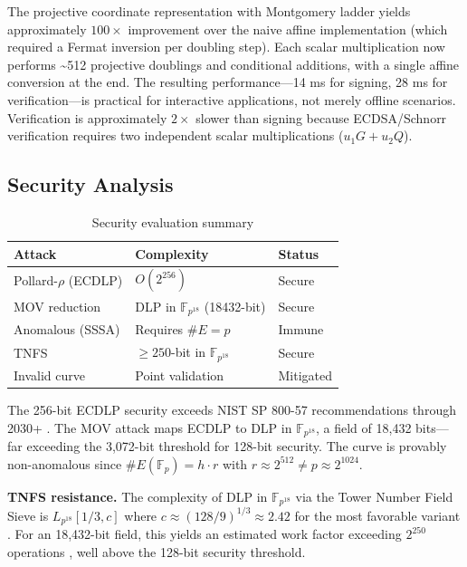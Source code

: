 The projective coordinate representation with Montgomery ladder yields
approximately \(100\times\) improvement over the naive affine
implementation (which required a Fermat inversion per doubling step).
Each scalar multiplication now performs \textasciitilde512 projective
doublings and conditional additions, with a single affine conversion at
the end. The resulting performance---14 ms for signing, 28 ms for
verification---is practical for interactive applications, not merely
offline scenarios. Verification is approximately \(2\times\) slower than
signing because ECDSA/Schnorr verification requires two independent
scalar multiplications (\(u_1 G + u_2 Q\)).

\subsection{Security Analysis}\label{security-analysis}

\begin{table}[t]
\centering
\caption{Security evaluation summary}
\label{tab:security}
\scriptsize
\begin{tabular}{lll}
\toprule
Attack & Complexity & Status \\
\midrule
Pollard-$\rho$ (ECDLP) & $O(2^{256})$ & Secure \\
MOV reduction & DLP in $\mathbb{F}_{p^{18}}$ (18432-bit) & Secure \\
Anomalous (SSSA) & Requires $\#E = p$ & Immune \\
TNFS \cite{BarbulescuDuquesne2019} & $\geq 250$-bit in $\mathbb{F}_{p^{18}}$ & Secure \\
Invalid curve & Point validation & Mitigated \\
\bottomrule
\end{tabular}
\end{table}

The 256-bit ECDLP security exceeds NIST SP 800-57 recommendations
through 2030+ \cite{NIST80057}. The MOV attack \cite{MOV1993} maps
ECDLP to DLP in \(\mathbb{F}_{p^{18}}\), a field of 18,432 bits---far
exceeding the 3,072-bit threshold for 128-bit security. The curve is
provably non-anomalous \cite{SmartAnomaly1999} since
\(\#E(\mathbb{F}_p) = h \cdot r\) with
\(r \approx 2^{512} \neq p \approx 2^{1024}\).

\textbf{TNFS resistance.} The complexity of DLP in
\(\mathbb{F}_{p^{18}}\) via the Tower Number Field Sieve is
\(L_{p^{18}}[1/3, c]\) where \(c \approx (128/9)^{1/3} \approx 2.42\)
for the most favorable variant \cite{KimBarbulescu2016}. For an
18,432-bit field, this yields an estimated work factor exceeding
\(2^{250}\) operations \cite{BarbulescuDuquesne2019}, well above the
128-bit security threshold.

